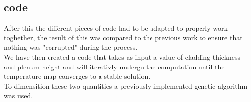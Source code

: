 \subsection{code}
After this the different pieces of code had to be adapted to properly work toghether, 
the result of this was compared to the previous work to ensure that nothing was "corrupted" during the process. \\
We have then created a code that takes as input a value of cladding thickness and plenum height 
and will iterativly undergo the computation until the temperature map converges to a stable solution. \\
To dimensition these two quantities a previously implemented genetic algorithm was used. \\